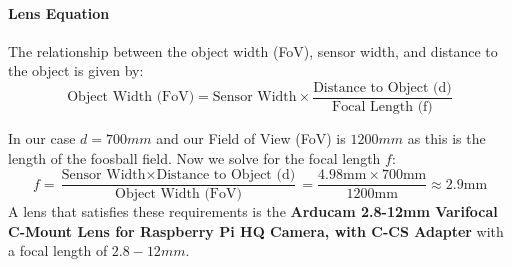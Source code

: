 \paragraph{Lens Equation}\label{par:lens_equation}

The relationship between the object width (FoV), sensor width, and distance to the object is given by:
\begin{equation}
    \text{Object Width (FoV)} = \text{Sensor Width} \times \frac{\text{Distance to Object (d)}}{\text{Focal Length (f)}}\label{eq:lens_equation}
\end{equation}


\noindent In our case $d = 700mm$ and our Field of View (FoV) is $1200mm$ as this is the length of the foosball field.
Now we solve for the focal length $f$:
\begin{equation}
    \label{eq:focal_length}
    f = \frac{\text{Sensor Width} \times \text{Distance to Object (d)}}{\text{Object Width (FoV)}} = \frac{4.98\text{mm} \times 700\text{mm}}{1200\text{mm}} \approx 2.9\text{mm}
\end{equation}
A lens that satisfies these requirements is the \textbf{Arducam 2.8-12mm Varifocal C-Mount Lens for Raspberry Pi HQ Camera, with C-CS Adapter} with a focal length of $2.8-12mm$.
